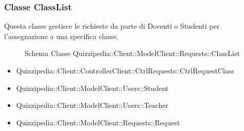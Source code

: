 \subsubsection{Classe ClassList}
Questa classe gestisce le richieste da parte di Docenti o Studenti per l'assegnazione a una specifica classe.
\begin{figure}[H]
\centering
\noindent{}
\caption{Schema Classe Quizzipedia::Client::ModelClient::Requests::ClassList}
\end{figure}
\begin{itemize}
\item Quizzipedia::Client::ControllerClient::CtrlRequests::CtrlRequestClass
\item Quizzipedia::Client::ModelClient::Users::Student
\item Quizzipedia::Client::ModelClient::Users::Teacher
\end{itemize}
\begin{itemize}
\item Quizzipedia::Client::ModelClient::Requests::Request
\end{itemize}
